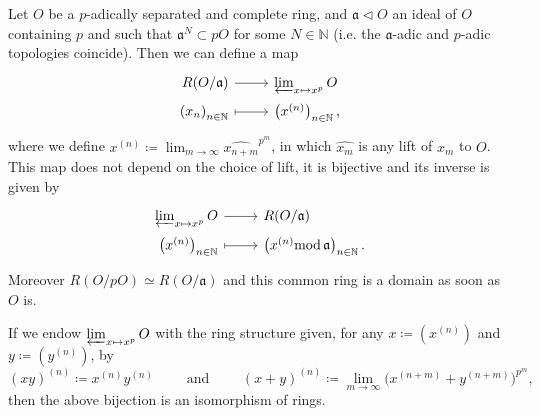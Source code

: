 \begin{prop}
	Let $O$ be a $p$-adically separated and complete ring, and $\mathfrak{a} \triangleleft O$
	an ideal of $O$ containing $p$ and such that $\mathfrak{a}^N \subset pO$ for some $N \in \mathbb{N}$
	(i.e. the $\mathfrak{a}$-adic and $p$-adic topologies coincide).
	Then we can define a map
	\begin{equation*}
	\begin{tikzcd}[row sep = 0ex
		,/tikz/column 1/.append style={anchor=base east}
		,/tikz/column 2/.append style={anchor=base west}]
		R(O/\mathfrak{a}) \arrow[r, "", rightarrow] &
		\varprojlim_{x \mapsto x^p} O \\
		\left( x_n \right)_{n \in \mathbb{N}} \arrow[r, "", mapsto] & 
		\left( x^{(n)} \right)_{n \in \mathbb{N}}
	,\end{tikzcd}
	\end{equation*} 
	where we define $x^{(n)} \coloneqq \lim_{m \to \infty} \widehat{x_{n+m}}^{p^m}$,
	in which $\widehat{x_m}$ is any lift of $x_m$ to $O$.
	This map does not depend on the choice of lift, it is bijective
	and its inverse is given by
	\begin{equation*}
	\begin{tikzcd}[row sep = 0ex
		,/tikz/column 1/.append style={anchor=base east}
		,/tikz/column 2/.append style={anchor=base west}]
		\varprojlim_{x \mapsto x^p} O \arrow[r, "", rightarrow] &
		R(O/\mathfrak{a}) \\
		\left( x^{(n)} \right)_{n \in \mathbb{N}} \arrow[r, "", mapsto] & 
		\left( x^{(n)} \mathrm{mod}\, \mathfrak{a} \right)_{n \in \mathbb{N}}
	.\end{tikzcd}
	\end{equation*} 
	Moreover $R(O/pO) \simeq R(O/\mathfrak{a})$ and this common ring
	is a domain as soon as $O$ is.
\end{prop}


\begin{rem}[]
	If we endow $\varprojlim_{x \mapsto x^p} O$ with the ring structure
	given, for any $x \coloneqq \left( x^{(n)} \right)$ and 
	$y \coloneqq \left( y^{(n)} \right)$, 
	by
	\begin{equation*}
		\left( xy \right)^{(n)} \coloneqq x^{(n)} y^{(n)}
		\qquad \text{ and } \qquad
		\left( x + y \right)^{(n)} \coloneqq
		\lim_{m \to \infty} \big( x^{(n+m)} +
		y^{(n+m)}\big)^{p^m}
	,\end{equation*}
	then the above bijection is an isomorphism of rings.
\end{rem}


